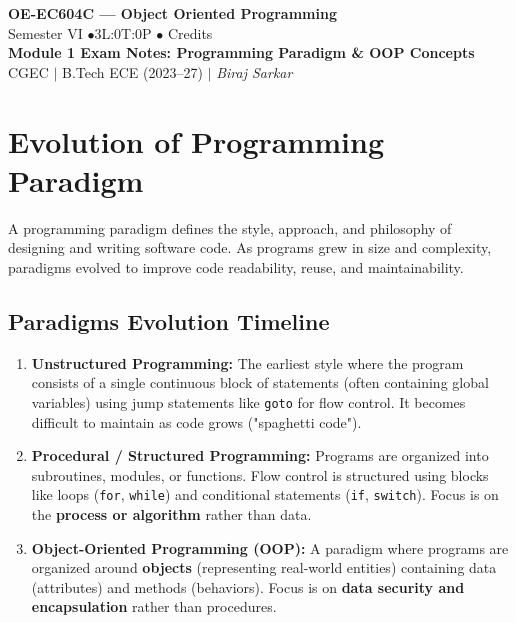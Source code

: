 \documentclass[12pt,a4paper]{article}
\begin{document}

\begin{center}
  {\LARGE\bfseries\color{myred} OE-EC604C --- Object Oriented Programming}\\[5pt]
  {\normalsize\color{mydark} Semester VI \quad$\bullet$\quad 3L:0T:0P \quad$\bullet$ Credits}\\[3pt]
  {\normalsize\color{myteal}\textbf{Module 1 Exam Notes: Programming Paradigm \& OOP Concepts}}\\[3pt]
  {\small\color{mydark} CGEC \;$|$\; B.Tech ECE (2023--27) \;$|$\; \textit{Biraj Sarkar}}
\end{center}
\vspace{2pt}
\noindent{\color{myred}\rule{\linewidth}{1.5pt}}
\vspace{2pt}

\hypersetup{linkcolor=mydark}
\tableofcontents
\hypersetup{linkcolor=myteal}
\newpage

\section{Evolution of Programming Paradigm}

A programming paradigm defines the style, approach, and philosophy of designing and writing software code. As programs grew in size and complexity, paradigms evolved to improve code readability, reuse, and maintainability.

\subsection{Paradigms Evolution Timeline}
\begin{enumerate}[label=\textbf{\arabic*.}, leftmargin=*, itemsep=4pt]
  \item \textbf{Unstructured Programming:} The earliest style where the program consists of a single continuous block of statements (often containing global variables) using jump statements like \texttt{goto} for flow control. It becomes difficult to maintain as code grows ("spaghetti code").
  \item \textbf{Procedural / Structured Programming:} Programs are organized into subroutines, modules, or functions. Flow control is structured using blocks like loops (\texttt{for}, \texttt{while}) and conditional statements (\texttt{if}, \texttt{switch}). Focus is on the \textbf{process or algorithm} rather than data.
  \item \textbf{Object-Oriented Programming (OOP):} A paradigm where programs are organized around \textbf{objects} (representing real-world entities) containing data (attributes) and methods (behaviors). Focus is on \textbf{data security and encapsulation} rather than procedures.
\end{enumerate}
\end{document}
